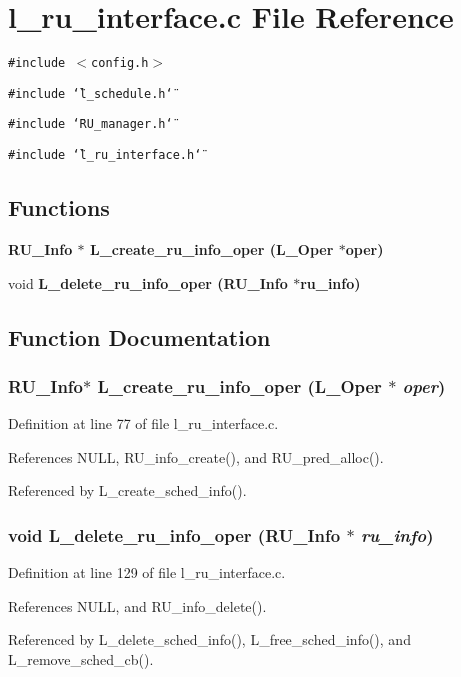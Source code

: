 \section{l\_\-ru\_\-interface.c File Reference}
\label{l__ru__interface_8c}
{\tt \#include $<$config.h$>$}\par
{\tt \#include \char`\"{}l\_\-schedule.h\char`\"{}}\par
{\tt \#include \char`\"{}RU\_\-manager.h\char`\"{}}\par
{\tt \#include \char`\"{}l\_\-ru\_\-interface.h\char`\"{}}\par
\subsection*{Functions}
\begin{CompactItemize}
\item 
\bf{RU\_\-Info} $\ast$ \bf{L\_\-create\_\-ru\_\-info\_\-oper} (L\_\-Oper $\ast$oper)
\item 
void \bf{L\_\-delete\_\-ru\_\-info\_\-oper} (\bf{RU\_\-Info} $\ast$ru\_\-info)
\end{CompactItemize}


\subsection{Function Documentation}
\subsubsection{\setlength{\rightskip}{0pt plus 5cm}\bf{RU\_\-Info}$\ast$ L\_\-create\_\-ru\_\-info\_\-oper (L\_\-Oper $\ast$ {\em oper})}\label{l__ru__interface_8c_67483f170cf0499fd0a9883f20996904}




Definition at line 77 of file l\_\-ru\_\-interface.c.

References NULL, RU\_\-info\_\-create(), and RU\_\-pred\_\-alloc().

Referenced by L\_\-create\_\-sched\_\-info().
\subsubsection{\setlength{\rightskip}{0pt plus 5cm}void L\_\-delete\_\-ru\_\-info\_\-oper (\bf{RU\_\-Info} $\ast$ {\em ru\_\-info})}\label{l__ru__interface_8c_eb901062d6a1d316284588ab0c1a1748}




Definition at line 129 of file l\_\-ru\_\-interface.c.

References NULL, and RU\_\-info\_\-delete().

Referenced by L\_\-delete\_\-sched\_\-info(), L\_\-free\_\-sched\_\-info(), and L\_\-remove\_\-sched\_\-cb().